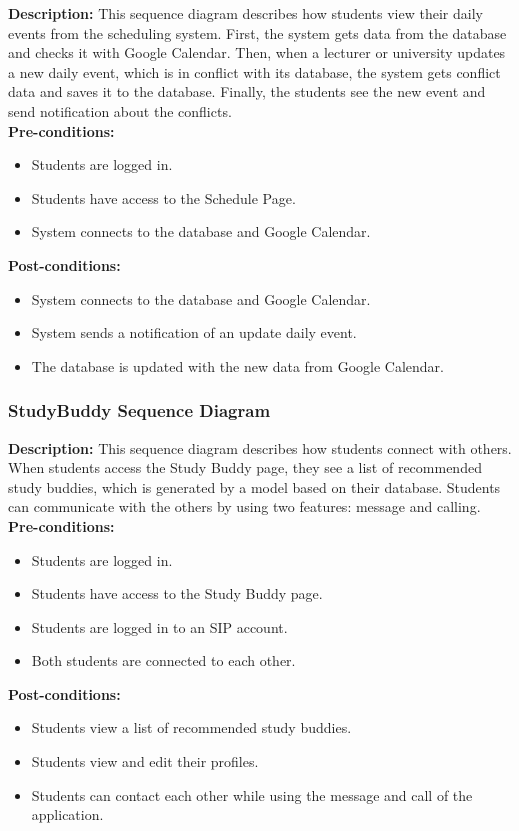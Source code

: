 \textbf{Description:} This sequence diagram describes how students view their daily events from the scheduling system. 
First, the system gets data from the database and checks it with Google Calendar. Then, when a lecturer or university updates a new daily event, which is in conflict with its database, the system gets conflict data and saves it to the database. 
Finally, the students see the new event and send notification about the conflicts. \\

\noindent \textbf{Pre-conditions:} 
    \begin{itemize}
        \item Students are logged in.
        \item Students have access to the Schedule Page.
        \item System connects to the database and Google Calendar.
    \end{itemize}

\noindent \textbf{Post-conditions:}
\begin{itemize}
    \item System connects to the database and Google Calendar.
    \item System sends a notification of an update daily event.
    \item The database is updated with the new data from Google Calendar.
\end{itemize}

\subsubsection{StudyBuddy Sequence Diagram}
\textbf{Description:} This sequence diagram describes how students connect with others. 
When students access the Study Buddy page, they see a list of recommended study buddies, which is generated by a model based on their database. 
Students can communicate with the others by using two features: message and calling. \\

\noindent \textbf{Pre-conditions:} 
    \begin{itemize}
        \item Students are logged in.
        \item Students have access to the Study Buddy page.
        \item Students are logged in to an SIP account.
        \item Both students are connected to each other.
    \end{itemize}
\noindent \textbf{Post-conditions:}
\begin{itemize}
    \item Students view a list of recommended study buddies.
    \item Students view and edit their profiles.
    \item Students can contact each other while using the message and call of the application.
\end{itemize}

